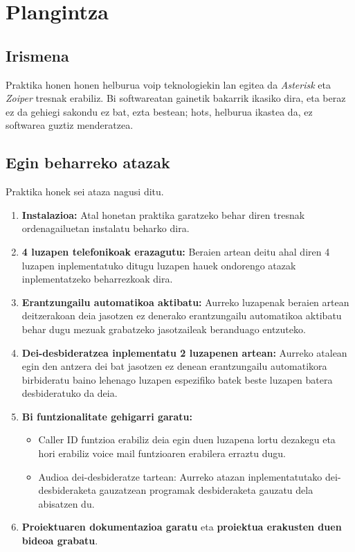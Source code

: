 \chapter{Plangintza}

\localtableofcontents

\section{Irismena}

Praktika honen honen helburua \gls{voip} teknologiekin lan egitea da \textit{Asterisk} eta \textit{Zoiper} tresnak erabiliz. Bi softwareatan gainetik bakarrik ikasiko dira, eta beraz ez da gehiegi sakondu ez bat, ezta bestean; hots, helburua ikastea da, ez softwarea guztiz menderatzea.

\section{Egin beharreko atazak}

Praktika honek sei ataza nagusi ditu.
\begin{enumerate}
    \item \textbf{Instalazioa:} Atal honetan praktika garatzeko behar diren tresnak ordenagailuetan instalatu beharko dira.
    \item \textbf{4 luzapen telefonikoak erazagutu:} Beraien artean deitu ahal diren 4 luzapen inplementatuko ditugu luzapen hauek ondorengo atazak inplementatzeko beharrezkoak dira.
    \item \textbf{Erantzungailu automatikoa aktibatu:} Aurreko luzapenak beraien artean deitzerakoan deia jasotzen ez denerako erantzungailu automatikoa aktibatu behar dugu mezuak grabatzeko jasotzaileak beranduago entzuteko.
    \item \textbf{Dei-desbideratzea inplementatu 2 luzapenen artean:} Aurreko atalean egin den antzera dei bat jasotzen ez denean erantzungailu automatikora birbideratu baino lehenago luzapen espezifiko batek beste luzapen batera desbideratuko da deia.
    \item \textbf{Bi funtzionalitate gehigarri garatu:}
    \begin{itemize}
        \item Caller ID funtzioa erabiliz deia egin duen luzapena lortu dezakegu eta hori erabiliz voice mail funtzioaren erabilera erraztu dugu.
        \item Audioa dei-desbideratze tartean: Aurreko atazan inplementatutako dei-desbideraketa gauzatzean programak desbideraketa gauzatu dela abisatzen du.
    \end{itemize}
    \item \textbf{Proiektuaren dokumentazioa garatu} eta \textbf{proiektua erakusten duen bideoa grabatu}.
\end{enumerate}

